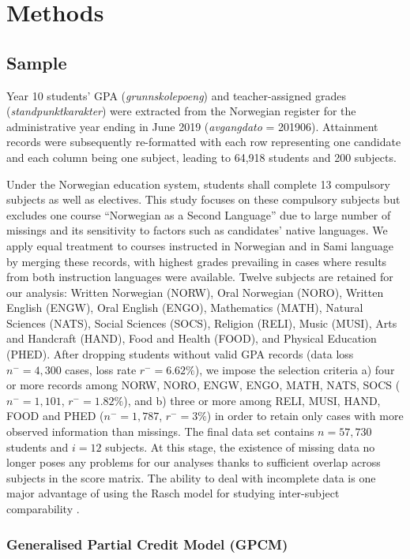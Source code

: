 \section{Methods}

\subsection{Sample}

Year 10 students' GPA (\textit{grunnskolepoeng}) and teacher-assigned grades (\textit{standpunktkarakter}) were extracted from the Norwegian register for the administrative year ending in June 2019 (\textit{avgangdato} = 201906). Attainment records were subsequently re-formatted with each row representing one candidate and each column being one subject, leading to 64,918 students and 200 subjects.

Under the Norwegian education system, students shall complete 13 compulsory subjects as well as electives. This study focuses on these compulsory subjects but excludes one course ``Norwegian as a Second Language'' due to large number of missings and its sensitivity to factors such as candidates' native languages. We apply equal treatment to courses instructed in Norwegian and in Sami language by merging these records, with highest grades prevailing in cases where results from both instruction languages were available. Twelve subjects are retained for our analysis: Written Norwegian (NORW), Oral Norwegian (NORO), Written English (ENGW), Oral English (ENGO), Mathematics (MATH), Natural Sciences (NATS), Social Sciences (SOCS), Religion (RELI), Music (MUSI), Arts and Handcraft (HAND), Food and Health (FOOD), and Physical Education (PHED). After dropping students without valid GPA records (data loss $n^-= 4,300$ cases, loss rate $r^- = 6.62\%$), we impose the selection criteria a) four or more records among NORW, NORO, ENGW, ENGO, MATH, NATS, SOCS ($n^- = 1,101$, $r^- = 1.82\%$), and b) three or more among RELI, MUSI, HAND, FOOD and PHED ($n^-= 1,787$, $r^- = 3\%$) in order to retain only cases with more observed information than missings. The final data set contains $n = 57,730$ students and $i = 12$ subjects. At this stage, the existence of missing data no longer poses any problems for our analyses thanks to sufficient overlap across subjects in the score matrix. The ability to deal with incomplete data is one major advantage of using the Rasch model for studying inter-subject comparability \parencite{he:2018}.

\subsubsection{Generalised Partial Credit Model (GPCM)}

